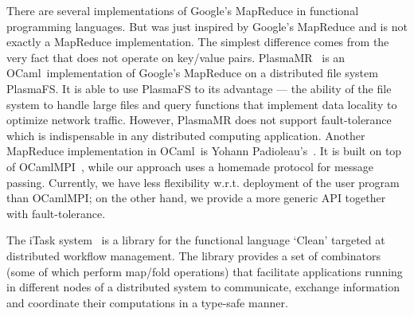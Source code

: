 \documentclass{llncs}
\newcommand{\Ocaml}{OCaml}
\begin{document}
There are several implementations of Google's MapReduce in functional
programming languages. But  was just inspired by Google's
MapReduce and is not exactly a MapReduce implementation. The
simplest difference comes from the very fact that  does not
operate on key/value pairs. 
PlasmaMR~\cite{plasma} is an \Ocaml\ implementation of Google's
MapReduce on a distributed file system PlasmaFS. It is able to use
PlasmaFS to its advantage --- the ability of the file system to handle
large files and query functions that implement data locality to
optimize network traffic. However, PlasmaMR does not support 
fault-tolerance which is indispensable in any distributed computing
application.
Another MapReduce
implementation in \Ocaml\ is Yohann
Padioleau's~\cite{poor-man-mapreduce}.  It is built on
top of OCamlMPI~\cite{ocamlMPI}, while our approach uses a homemade
protocol for message passing. Currently, we have less flexibility
w.r.t. deployment of the user program than OCamlMPI; on the other
hand, we provide a more generic API together with fault-tolerance.

The iTask system~\cite{iTask} is a library for the functional language
`Clean' targeted at distributed workflow management. The library
provides a set of combinators (some of which perform map/fold
operations) that facilitate applications running in different nodes
of a distributed system to communicate, exchange information and
coordinate their computations in a type-safe manner.
\end{document}
